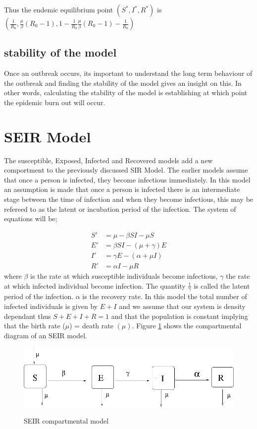  Thus the endemic equilibrium point $( S^*,I^*,R^*)$ is 
 $\left( \frac{1}{R_0}, \frac{\mu}{\beta} (R_0 -1), 1 -  \frac{1}{R_0} \frac{\mu}{\beta} (R_0 -1) - \frac{1}{R_0} \right)$
 
 
  \subsection{stability of the model}
 Once an outbreak occurs, its important to understand the long term behaviour of the outbreak and finding the stability of the model gives an insight on this. In other words, calculating the stability of the model is establishing at which point the epidemic burn out will occur.
 \section{SEIR Model}
The susceptible, Exposed, Infected and Recovered models add a new comportment to the previously discussed SIR Model. The earlier models assume that once a person is infected, they become infectious immediately. In this model an assumption is made that once a person is infected there is an intermediate stage between the time of infection and when they become infectious, this may be refereed to as the latent or incubation period of the infection. The system of equations will be;

\begin{align}
S'& = \mu -\beta S I - \mu S \label{5} \\
E' &= \beta S I - (\mu + \gamma) E  \label{6}\\
I' &= \gamma E - (\alpha + \mu I) \label{7}\\
R' &= \alpha I  - \mu R \label{8}
\end{align}
where $\beta$ is the rate at which susceptible individuals become infectious, $\gamma$ the rate at which infected individual become infection. The quantity $\frac{1}{\gamma}$ is called the latent period of the  infection. $\alpha$ is the recovery rate.
In this model the total number of infected individuals is given by $E +I$ and  we assume that our system is density dependant thus $S + E + I + R = 1$ and  that the population is constant implying that the birth rate ($\mu$)  = death rate $(\mu)$. Figure \ref{fig 4.2} shows the compartmental diagram of an SEIR model.
\begin{figure}[h!]
 \caption{SEIR compartmental model}
 \centering
 \includegraphics[scale=0.5]{images/seir.png}\label{fig 4.2}
 \end{figure}
  
